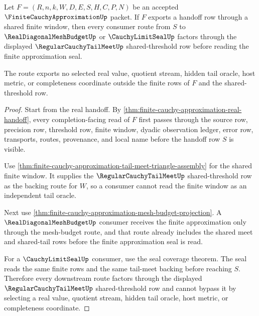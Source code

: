 \begin{theorem}
\label{thm:finite-cauchy-approximation-tail-meet-dependency-route}
Let $F=(R,n,k,W,D,E,S,H,C,P,N)$ be an accepted $\FiniteCauchyApproximationUp$ packet. If $F$ exports a handoff row through a shared finite window, then every consumer route from $S$ to $\RealDiagonalMeshBudgetUp$ or $\CauchyLimitSealUp$ factors through the displayed $\RegularCauchyTailMeetUp$ shared-threshold row before reading the finite approximation seal.

The route exports no selected real value, quotient stream, hidden tail oracle, host metric, or completeness coordinate outside the finite rows of $F$ and the shared-threshold row.
\end{theorem}
\begin{proof}
Start from the real handoff. By \autoref{thm:finite-cauchy-approximation-real-handoff}, every completion-facing read of $F$ first passes through the source row, precision row, threshold row, finite window, dyadic observation ledger, error row, transports, routes, provenance, and local name before the handoff row $S$ is visible.

Use \autoref{thm:finite-cauchy-approximation-tail-meet-triangle-assembly} for the shared finite window. It supplies the $\RegularCauchyTailMeetUp$ shared-threshold row as the backing route for $W$, so a consumer cannot read the finite window as an independent tail oracle.

Next use \autoref{thm:finite-cauchy-approximation-mesh-budget-projection}. A $\RealDiagonalMeshBudgetUp$ consumer receives the finite approximation only through the mesh-budget route, and that route already includes the shared meet and shared-tail rows before the finite approximation seal is read.

For a $\CauchyLimitSealUp$ consumer, use the seal coverage theorem. The seal reads the same finite rows and the same tail-meet backing before reaching $S$. Therefore every downstream route factors through the displayed $\RegularCauchyTailMeetUp$ shared-threshold row and cannot bypass it by selecting a real value, quotient stream, hidden tail oracle, host metric, or completeness coordinate.
\end{proof}

